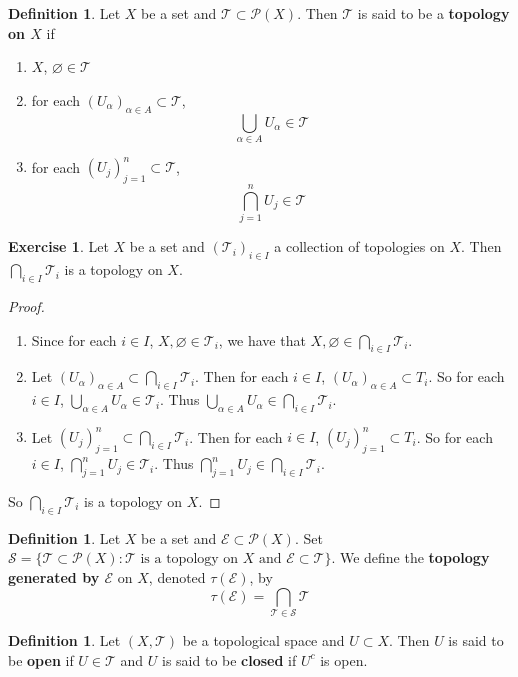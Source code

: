 \documentclass[12pt]{amsart}
\theoremstyle{definition}
\newtheorem{defn}[definition]{Definition}
\newtheorem{ex}[definition]{Exercise}
\newcommand{\al}{\alpha}
\newcommand{\MS}{\mathcal{S}}
\newcommand{\MP}{\mathcal{P}}
\newcommand{\ME}{\mathcal{E}}
\newcommand{\MT}{\mathcal{T}}
\newcommand{\lex}[1]{\label{ex:#1}}
\newcommand{\ld}[1]{\label{defn:#1}}
\begin{document}
	\begin{defn} \ld{}
	Let $X$ be a set and $\MT \subset \MP(X)$. Then $\MT$ is said to be a \textbf{topology on $X$} if 
	\begin{enumerate}
	\item $X$, $\varnothing \in \MT$ 
	\item for each $(U_{\al})_{\al \in A} \subset \MT$, $$\bigcup_{\al \in A}U_{\al} \in \MT$$
	\item for each $(U_j)_{j=1}^n \subset \MT$, $$\bigcap_{j=1}^n U_{j} \in \MT$$
	\end{enumerate}
	\end{defn}		
	
	\begin{ex} \lex{} 
		Let $X$ be a set and $(\MT_{i})_{i \in I}$ a collection of topologies on $X$. Then $\bigcap\limits_{i \in I}\MT_i$ is a topology on $X$.
	\end{ex}
	
	\begin{proof}\
	\begin{enumerate}
	\item Since for each $i \in I$, $X, \varnothing \in \MT_{i}$, we have that $X, \varnothing \in \bigcap\limits_{i \in I}\MT_i$.
	\item Let $(U_{\al})_{\al \in A} \subset \bigcap\limits_{i \in I}\MT_i$. Then for each $i \in I$, $(U_{\al})_{\al \in A} \subset T_i$. So for each $i \in I$, $\bigcup\limits_{\al \in A}U_{\al} \in \MT_i$. Thus $\bigcup\limits_{\al \in A}U_{\al} \in \bigcap\limits_{i \in I}\MT_i$.
	\item Let $(U_{j})_{j=1}^n \subset \bigcap\limits_{i \in I}\MT_i$. Then for each $i \in I$, $(U_{j})_{j=1}^n \subset T_i$. So for each $i \in I$, $\bigcap\limits_{j=1}^n U_{j} \in \MT_i$. Thus $\bigcap\limits_{j=1}^n U_{j} \in \bigcap\limits_{i \in I}\MT_i$.
	\end{enumerate}
	So $\bigcap\limits_{i \in I}\MT_i$ is a topology on $X$.
	\end{proof}
	
	\begin{defn} \ld{}
	Let $X$ be a set and $\ME \subset \MP(X)$. Set $\MS = \{\MT \subset \MP(X): \MT \text{ is a topology on $X$ and $\ME \subset \MT$}\}$. We define the \textbf{topology generated by $\ME$} on $X$, denoted $\tau(\ME)$, by $$\tau(\ME) = \bigcap_{\MT \in \MS} \MT$$
	\end{defn}
	
	\begin{defn} \ld{}
	Let $(X, \MT)$ be a topological space and $U \subset X$. Then $U$ is said to be \textbf{open} if $U \in \MT$ and $U$ is said to be \textbf{closed} if $U^c$ is open.
	\end{defn}
	
\end{document}
